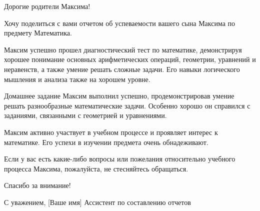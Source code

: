 \documentclass{article}
\begin{document}
Дорогие родители Максима!

Хочу поделиться с вами отчетом об успеваемости вашего сына Максима по предмету Математика.

Максим успешно прошел диагностический тест по математике, демонстрируя хорошее понимание основных арифметических операций, геометрии, уравнений и неравенств, а также умение решать сложные задачи. Его навыки логического мышления и анализа также на хорошем уровне.

Домашнее задание Максим выполнил успешно, продемонстрировав умение решать разнообразные математические задачи. Особенно хорошо он справился с заданиями, связанными с геометрией и уравнениями.

Максим активно участвует в учебном процессе и проявляет интерес к математике. Его успехи в изучении предмета очень обнадеживают.

Если у вас есть какие-либо вопросы или пожелания относительно учебного процесса Максима, пожалуйста, не стесняйтесь обращаться.

Спасибо за внимание!

С уважением,
[Ваше имя]
Ассистент по составлению отчетов
\end{document}
